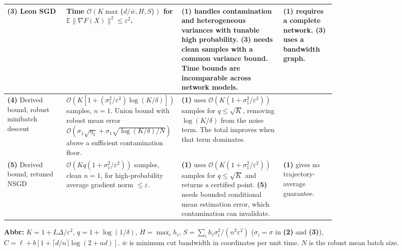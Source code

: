 \begin{table}[tp]
\begin{threeparttable}
\begin{tabularx}{\linewidth}{@{}>{\raggedright\arraybackslash}p{0.18\linewidth}>{\raggedright\arraybackslash}p{0.29\linewidth}>{\raggedright\arraybackslash}p{0.31\linewidth}>{\raggedright\arraybackslash}X@{}}
\midrule
\textbf{(3)} Leon SGD \citep[Thm.~1.7]{bhTyurinLeonV1} & Time $\mathcal{O}(K\max\{d/\bar w,H,S\})$ for $\mathbb E\|\nabla F(X)\|^2\le\varepsilon^2$. & \textbf{(1)} handles contamination and heterogeneous variances with tunable high probability. \textbf{(3)} needs clean samples with a common variance bound. Time bounds are incomparable across network models. & \textbf{(1)} requires a complete network. \textbf{(3)} uses a bandwidth graph. \\
\midrule
\textbf{(4)} Derived bound, robust minibatch descent & $\mathcal{O}(K[1+(\sigma_1^2/\varepsilon^2)\log(K/\delta)])$ samples, $n=1$. Union bound with robust mean error $\mathcal{O}(\sigma_1\sqrt{\eta_1}+\sigma_1\sqrt{\log(K/\delta)/N})$ above a sufficient contamination floor. & \textbf{(1)} uses $\mathcal{O}(K(1+\sigma_1^2/\varepsilon^2))$ samples for $q\le\sqrt K$, removing $\log(K/\delta)$ from the noise term. The total improves when that term dominates. &  \\
\midrule
\textbf{(5)} Derived bound, retuned NSGD \citep[Thm.~4]{dcsnHublerV3} & $\mathcal{O}(Kq(1+\sigma_1^2/\varepsilon^2))$ samples, clean $n=1$, for high-probability average gradient norm $\le\varepsilon$. & \textbf{(1)} uses $\mathcal{O}(K(1+\sigma_1^2/\varepsilon^2))$ samples for $q\le\sqrt K$ and returns a certified point. \textbf{(5)} needs bounded conditional mean estimation error, which contamination can invalidate. & \textbf{(1)} gives no trajectory-average guarantee. \\
\bottomrule
\end{tabularx}
\begin{tablenotes}[flushleft]\footnotesize
\item[] \textbf{Abbr:} $K=1+L\Delta/\varepsilon^2$, $q=1+\log(1/\delta)$, $H=\max_i h_i$, $S=\sum_i h_i\sigma_i^2/(n^2\varepsilon^2)$ ($\sigma_i=\sigma$ in \textbf{(2)} and \textbf{(3)}), $C=\ell+b[1+\lceil d/n\rceil\log(2+nd)]$. $\bar w$ is minimum cut bandwidth in coordinates per unit time. $N$ is the robust mean batch size.
\end{tablenotes}
\end{threeparttable}
\end{table}

